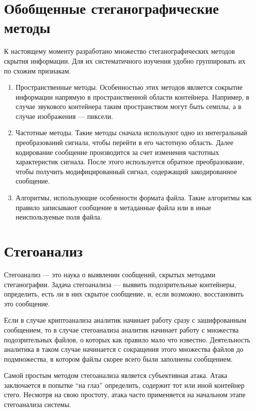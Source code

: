 \section{Обобщенные стеганографические методы}
К настоящему моменту разработано множество стеганографических методов скрытия информации.
Для их систематичного изучения удобно группировать их по схожим признакам.
\begin{enumerate}
    \item Пространственные методы. Особенностью этих методов является сокрытие информации напрямую
    в пространственной области контейнера. Например,
    в случае звукового контейнера  таким пространством могут быть семплы,
    а в случае изображения --- пиксели.
    \item Частотные методы. Такие методы сначала используют одно из интегральный преобразований сигнала,
    чтобы перейти в его частотную область. Далее кодирование сообщение производится за счет изменения частотных
    характеристик сигнала. После этого используется обратное преобразование, чтобы получить модифицированный сигнал,
    содержащий закодированное сообщение.
    \item Алгоритмы, использующие особенности формата файла. Такие алгоритмы как правило записывают
    сообщение в метаданные файла или в иные неиспользуемые поля файла.
\end{enumerate}

\section{Стегоанализ}
Стегоанализ --- это наука о выявлении сообщений, скрытых методами стеганографии.
Задача стегоанализа --- выявить подозрительные контейнеры, определить, есть ли в них скрытое сообщение,
и, если возможно, восстановить это сообщение.

Если в случае криптоанализа аналитик начинает работу сразу с зашифрованным сообщением,
то в случае стегоанализа аналитик начинает работу с множества подозрительных файлов,
о которых как правило мало что известно. Деятельность аналитика в таком случае
начинается с сокращения этого множества файлов до подмножества, в котором файлы
скорее всего были заполнены сообщением.

Самой простым методом стегоанализа является субъективная атака. Атака заключается
в попытке ``на глаз'' определить, содержит тот или иной контейнер стего. Несмотря
на свою простоту, атака часто применяется на начальном этапе стегоанализа системы.

